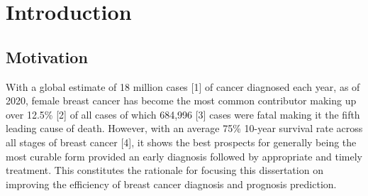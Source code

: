 \documentclass{l4proj}
\begin{document}
%
%
%
%
%
%
%
\chapter{Introduction}


\section{Motivation}
With a global estimate of 18 million cases [1] of cancer diagnosed each year, as of 2020, female breast cancer has become the most common contributor making up over 12.5\% [2] of all cases of which 684,996 [3] cases were fatal making it the fifth leading cause of death. However, with an average 75\% 10-year survival rate across all stages of breast cancer [4], it shows the best prospects for generally being the most curable form provided an early diagnosis followed by appropriate and timely treatment. This constitutes the rationale for focusing this dissertation on improving the efficiency of breast cancer diagnosis and prognosis prediction. 
\end{document}
